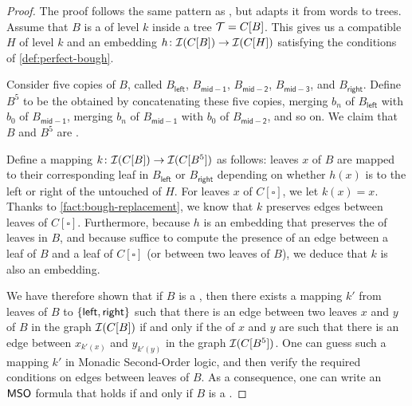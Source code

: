 \begin{proof}
  The proof follows the same pattern as 
  \cite[Lemma 19]{LOPEZ24}, but adapts it from words to trees. 
  Assume that $B$ is a  of level $k$ inside a tree
  $\t = C[B]$.
  This gives us a compatible  $H$ of level $k$
  and an embedding $h \colon \mathcal{I}(C[B]) \to \mathcal{I}(C[H])$
  satisfying the conditions of \cref{def:perfect-bough}.

  Consider five copies of $B$, called $B_\mathsf{left}$,
  $B_\mathsf{mid-1}$, $B_\mathsf{mid-2}$, $B_\mathsf{mid-3}$, and
  $B_\mathsf{right}$. Define $B^5$ to be the  obtained by
  concatenating these five copies, merging $b_n$ of $B_\mathsf{left}$ with $b_0$
  of $B_\mathsf{mid-1}$, merging $b_n$ of $B_\mathsf{mid-1}$ with $b_0$ of
  $B_\mathsf{mid-2}$, and so on. We claim that $B$ and $B^5$ are . 

  Define a mapping $k \colon \mathcal{I}(C[B]) \to
  \mathcal{I}(C[B^5])$
  as follows: leaves $x$ of $B$ are mapped to their
  corresponding leaf in $B_\mathsf{left}$ or $B_\mathsf{right}$ depending on
  whether $h(x)$ is to the left or right of the untouched  of
  $H$. For leaves $x$ of $C[\square]$, we let $k(x) = x$. 
  Thanks to \cref{fact:bough-replacement}, we know that
  $k$ preserves edges between leaves of $C[\square]$.
  Furthermore, because $h$ is an embedding that preserves the 
   of leaves in $B$, and because  suffice
  to compute the presence of an edge between a leaf of $B$ and a leaf of
  $C[\square]$ (or between two leaves of $B$), we deduce that $k$ is also an
  embedding.

  We have therefore shown that if $B$ is a , then there exists
  a mapping $k'$ from leaves of $B$ to $\{  \mathsf{left}, \mathsf{right}  \}$
  such that there is an edge between two leaves $x$ and $y$ of $B$ in the graph
  $\mathcal{I}(C[B])$ if and only if the  of $x$ and $y$ are
  such that there is an edge between $x_{k'(x)}$ and $y_{k'(y)}$ in the graph
  $\mathcal{I}(C[B^5])$. One can guess such a mapping $k'$ in Monadic Second-Order
  logic, and then verify the required conditions on edges between leaves of $B$.
  As a consequence, one can write an $\mathsf{MSO}$ formula that holds if and only if
  $B$ is a .
\end{proof}

